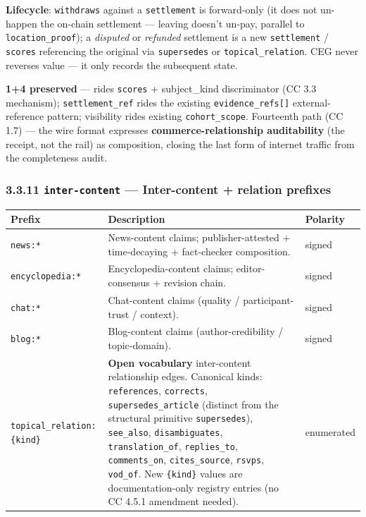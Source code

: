 \documentclass[11pt]{article}
\begin{document}
\textbf{Lifecycle}: \texttt{withdraws} against a \texttt{settlement} is forward-only (it does not un-happen the on-chain settlement — leaving doesn't un-pay, parallel to \texttt{location\_proof}); a \textit{disputed} or \textit{refunded} settlement is a new \texttt{settlement} / \texttt{scores} referencing the original via \texttt{supersedes} or \texttt{topical\_relation}. CEG never reverses value — it only records the subsequent state.


\textbf{1+4 preserved} — rides \texttt{scores} + subject\_kind discriminator (CC 3.3 mechanism); \texttt{settlement\_ref} rides the existing \texttt{evidence\_refs[]} external-reference pattern; visibility rides existing \texttt{cohort\_scope}. Fourteenth path (CC 1.7) — the wire format expresses \textbf{commerce-relationship auditability} (the receipt, not the rail) as composition, closing the last form of internet traffic from the completeness audit.


\subsubsection*{3.3.11 \texttt{inter-content} — Inter-content + relation prefixes}


{\footnotesize
\begin{longtable}{|p{5.33cm}|p{5.33cm}|p{5.33cm}|}\hline
\textbf{Prefix} & \textbf{Description} & \textbf{Polarity} \\ \hline\endhead
\texttt{news:*} & News-content claims; publisher-attested + time-decaying + fact-checker composition. & signed \\ \hline
\texttt{encyclopedia:*} & Encyclopedia-content claims; editor-consensus + revision chain. & signed \\ \hline
\texttt{chat:*} & Chat-content claims (quality / participant-trust / context). & signed \\ \hline
\texttt{blog:*} & Blog-content claims (author-credibility / topic-domain). & signed \\ \hline
\texttt{topical\_relation:\{kind\}} & \textbf{Open vocabulary} inter-content relationship edges. Canonical kinds: \texttt{references}, \texttt{corrects}, \texttt{supersedes\_article} (distinct from the structural primitive \texttt{supersedes}), \texttt{see\_also}, \texttt{disambiguates}, \texttt{translation\_of}, \texttt{replies\_to}, \texttt{comments\_on}, \texttt{cites\_source}, \texttt{rsvps}, \texttt{vod\_of}. New \texttt{\{kind\}} values are documentation-only registry entries (no CC 4.5.1 amendment needed). & enumerated \\ \hline
\end{longtable}}
\end{document}
